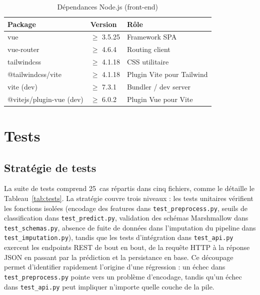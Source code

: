 \documentclass[12pt,a4paper,openany]{report}
\newcommand{\file}[1]{\texttt{#1}}
\begin{document}
\begin{table}[H]
    \centering
    \caption{Dépendances Node.js (front-end)}
    \label{tab:deps-node}
    \begin{tabular}{l l l}
        \toprule
        \textbf{Package} & \textbf{Version} & \textbf{Rôle} \\
        \midrule
        vue                  & $\geq$ 3.5.25  & Framework SPA \\
        vue-router           & $\geq$ 4.6.4   & Routing client \\
        tailwindcss          & $\geq$ 4.1.18  & CSS utilitaire \\
        @tailwindcss/vite    & $\geq$ 4.1.18  & Plugin Vite pour Tailwind \\
        \midrule
        vite (dev)           & $\geq$ 7.3.1   & Bundler / dev server \\
        @vitejs/plugin-vue (dev) & $\geq$ 6.0.2& Plugin Vue pour Vite \\
        \bottomrule
    \end{tabular}
\end{table}


\chapter{Tests}

\section{Stratégie de tests}

La suite de tests comprend 25~cas répartis dans cinq fichiers, comme le détaille le Tableau~\ref{tab:tests}. La stratégie couvre trois niveaux : les tests unitaires vérifient les fonctions isolées (encodage des features dans \file{test\_preprocess.py}, seuils de classification dans \file{test\_predict.py}, validation des schémas Marshmallow dans \file{test\_schemas.py}, absence de fuite de données dans l'imputation du pipeline dans \file{test\_imputation.py}), tandis que les tests d'intégration dans \file{test\_api.py} exercent les endpoints REST de bout en bout, de la requête HTTP à la réponse JSON en passant par la prédiction et la persistance en base. Ce découpage permet d'identifier rapidement l'origine d'une régression : un échec dans \file{test\_preprocess.py} pointe vers un problème d'encodage, tandis qu'un échec dans \file{test\_api.py} peut impliquer n'importe quelle couche de la pile.
\end{document}
